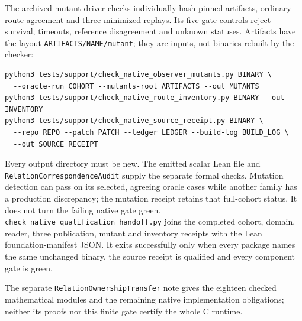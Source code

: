 \documentclass[11pt,a4paper]{article}
\newcommand{\code}[1]{\nolinkurl{#1}}
\begin{document}
The archived-mutant driver checks individually hash-pinned artifacts, ordinary-route
agreement and three minimized replays. Its five gate controls reject survival,
timeouts, reference disagreement and unknown statuses. Artifacts have the
layout \code{ARTIFACTS/NAME/mutant}; they are inputs, not binaries rebuilt by
the checker:
{\small\begin{verbatim}
python3 tests/support/check_native_observer_mutants.py BINARY \
  --oracle-run COHORT --mutants-root ARTIFACTS --out MUTANTS
python3 tests/support/check_native_route_inventory.py BINARY --out INVENTORY
python3 tests/support/check_native_source_receipt.py BINARY \
  --repo REPO --patch PATCH --ledger LEDGER --build-log BUILD_LOG \
  --out SOURCE_RECEIPT
\end{verbatim}}
Every output directory must be new. The emitted scalar Lean file
and \code{RelationCorrespondenceAudit} supply the separate formal checks.
Mutation detection can pass on its selected, agreeing oracle cases while
another family has a production discrepancy; the mutation receipt retains
that full-cohort status. It does not turn the failing native gate green.
\code{check_native_qualification_handoff.py} joins the completed cohort,
domain, reader, three publication, mutant and inventory receipts with the
Lean foundation-manifest JSON. It exits successfully only when every package
names the same unchanged binary, the source receipt is qualified and every
component gate is green.

The separate \code{RelationOwnershipTransfer} note gives the eighteen
checked mathematical modules and the remaining native implementation
obligations; neither its proofs nor this finite gate certify the whole C runtime.
\end{document}
